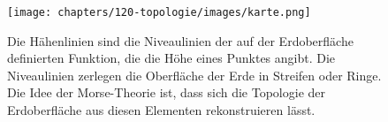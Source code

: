 %
%
%
\begin{figure}
\centering
\texttt{[image: chapters/120-topologie/images/karte.png]}
\caption{Die Hähenlinien sind die Niveaulinien der auf der Erdoberfläche
definierten Funktion, die die Höhe eines Punktes angibt.
Die Niveaulinien zerlegen die Oberfläche der Erde in Streifen oder Ringe.
Die Idee der Morse-Theorie ist, dass sich die Topologie der Erdoberfläche
aus diesen Elementen rekonstruieren lässt.
\label{buch:topologie:morse:fig:karte}}
\end{figure}

